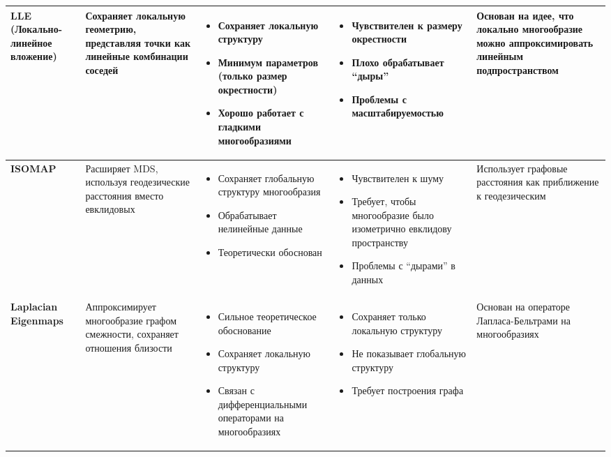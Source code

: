 \documentclass[a4paper,12pt]{article}
\begin{document}
{\begin{longtable}{|p{3.5cm}|p{3.5cm}|p{2.8cm}|p{2.8cm}|p{2.8cm}|}
\textbf{LLE (Локально-линейное вложение)} & 
Сохраняет локальную геометрию, представляя точки как линейные комбинации соседей & 
\begin{itemize}[leftmargin=*]
    \item Сохраняет локальную структуру
    \item Минимум параметров (только размер окрестности)
    \item Хорошо работает с гладкими многообразиями
\end{itemize} & 
\begin{itemize}[leftmargin=*]
    \item Чувствителен к размеру окрестности
    \item Плохо обрабатывает ``дыры''
    \item Проблемы с масштабируемостью
\end{itemize} & 
Основан на идее, что локально многообразие можно аппроксимировать линейным подпространством \\
\hline

\textbf{ISOMAP} & 
Расширяет MDS, используя геодезические расстояния вместо евклидовых & 
\begin{itemize}[leftmargin=*]
    \item Сохраняет глобальную структуру многообразия
    \item Обрабатывает нелинейные данные
    \item Теоретически обоснован
\end{itemize} & 
\begin{itemize}[leftmargin=*]
    \item Чувствителен к шуму
    \item Требует, чтобы многообразие было изометрично евклидову пространству
    \item Проблемы с ``дырами'' в данных
\end{itemize} & 
Использует графовые расстояния как приближение к геодезическим \\
\hline

\textbf{Laplacian Eigenmaps} & 
Аппроксимирует многообразие графом смежности, сохраняет отношения близости & 
\begin{itemize}[leftmargin=*]
    \item Сильное теоретическое обоснование
    \item Сохраняет локальную структуру
    \item Связан с дифференциальными операторами на многообразиях
\end{itemize} & 
\begin{itemize}[leftmargin=*]
    \item Сохраняет только локальную структуру
    \item Не показывает глобальную структуру
    \item Требует построения графа
\end{itemize} & 
Основан на операторе Лапласа-Бельтрами на многообразиях \\
\hline


\end{longtable}}
\end{document}
